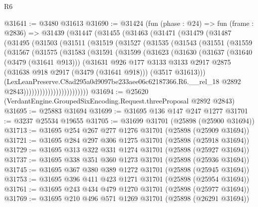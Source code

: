 \begin{lexlean}{R6}
\begin{coremodule}
@31641 := @3480 @31613
@31690 := @31424
    (fun (phase : @24) =>
    fun (frame : @2836) =>
    @31439
      (@31447
        (@31455
          (@31463
            (@31471
              (@31479
                (@31487
                  (@31495
                    (@31503
                      (@31511
                        (@31519
                          (@31527
                            (@31535
                              (@31543
                                (@31551
                                  (@31559
                                    (@31567
                                      (@31575
                                        (@31583
                                          (@31591
                                            (@31599
                                              (@31623
                                                (@31630
                                                  (@31637
                                                    (@31640 (@3479 (@31641 @913)))
                                                    (@31631
                                                      @926
                                                      @177
                                                      @3133
                                                      @3133
                                                      @2917
                                                      @2875
                                                      (@31638 @918 @2917 (@3479 (@31641 @918)))
                                                      (@3517 @31613)))
                                                  (LexLeanPreserve.C8ad295a0d9097be233aee06c62187366.R6.__rel_18
                                                    @2892
                                                    @2843))))))))))))))))))))))))
@31694 := @25620 (VerdantEngine.GroupedSixEncoding.Request.threeProposal @2892 @2843)
@31695 := @25883 @31694
@31699 := @31695 @136 @147 @247 @1277
@31701 := @3237 @25534 @19655
@31705 := @31699 @31701 (@25898 (@25900 @31694))
@31713 := @31695 @254 @267 @277 @1276 @31701 (@25898 (@25909 @31694))
@31721 := @31695 @284 @297 @306 @1275 @31701 (@25898 (@25918 @31694))
@31729 := @31695 @313 @322 @331 @1274 @31701 (@25898 (@25927 @31694))
@31737 := @31695 @338 @351 @360 @1273 @31701 (@25898 (@25936 @31694))
@31745 := @31695 @367 @380 @389 @1272 @31701 (@25898 (@25945 @31694))
@31753 := @31695 @396 @411 @423 @1271 @31701 (@25898 (@25954 @31694))
@31761 := @31695 @243 @434 @479 @1270 @31701 (@25898 (@25977 @31694))
@31769 := @31695 @210 @496 @571 @1269 @31701 (@25898 (@26291 @31694))

\end{coremodule}
\end{lexlean}

